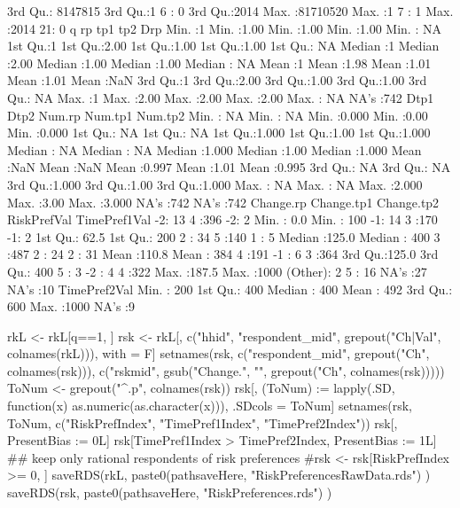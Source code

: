 \begin{Schunk}
\begin{Soutput}
 3rd Qu.: 8147815   3rd Qu.:1   6 :  0                  3rd Qu.:2014  
 Max.   :81710520   Max.   :1   7 :  1                  Max.   :2014  
                                21:  0                                
       q           rp            tp1            tp2            Drp     
 Min.   :1   Min.   :1.00   Min.   :1.00   Min.   :1.00   Min.   : NA  
 1st Qu.:1   1st Qu.:2.00   1st Qu.:1.00   1st Qu.:1.00   1st Qu.: NA  
 Median :1   Median :2.00   Median :1.00   Median :1.00   Median : NA  
 Mean   :1   Mean   :1.98   Mean   :1.01   Mean   :1.01   Mean   :NaN  
 3rd Qu.:1   3rd Qu.:2.00   3rd Qu.:1.00   3rd Qu.:1.00   3rd Qu.: NA  
 Max.   :1   Max.   :2.00   Max.   :2.00   Max.   :2.00   Max.   : NA  
                                                          NA's   :742  
      Dtp1          Dtp2         Num.rp         Num.tp1        Num.tp2     
 Min.   : NA   Min.   : NA   Min.   :0.000   Min.   :0.00   Min.   :0.000  
 1st Qu.: NA   1st Qu.: NA   1st Qu.:1.000   1st Qu.:1.00   1st Qu.:1.000  
 Median : NA   Median : NA   Median :1.000   Median :1.00   Median :1.000  
 Mean   :NaN   Mean   :NaN   Mean   :0.997   Mean   :1.01   Mean   :0.995  
 3rd Qu.: NA   3rd Qu.: NA   3rd Qu.:1.000   3rd Qu.:1.00   3rd Qu.:1.000  
 Max.   : NA   Max.   : NA   Max.   :2.000   Max.   :3.00   Max.   :3.000  
 NA's   :742   NA's   :742                                                 
 Change.rp   Change.tp1  Change.tp2  RiskPrefVal     TimePref1Val 
 -2: 13    4      :396   -2:  2     Min.   :  0.0   Min.   : 100  
 -1: 14    3      :170   -1:  2     1st Qu.: 62.5   1st Qu.: 200  
 2 : 34    5      :140   1 :  5     Median :125.0   Median : 400  
 3 :487    2      : 24   2 : 31     Mean   :110.8   Mean   : 384  
 4 :191    -1     :  6   3 :364     3rd Qu.:125.0   3rd Qu.: 400  
 5 :  3    -2     :  4   4 :322     Max.   :187.5   Max.   :1000  
           (Other):  2   5 : 16     NA's   :27      NA's   :10    
  TimePref2Val 
 Min.   : 200  
 1st Qu.: 400  
 Median : 400  
 Mean   : 492  
 3rd Qu.: 600  
 Max.   :1000  
 NA's   :9     
\end{Soutput}
\begin{Sinput}
rkL <- rkL[q==1, ]
rsk <- rkL[, c("hhid", "respondent_mid", grepout("Ch|Val", colnames(rkL))), with = F]
setnames(rsk, c("respondent_mid", grepout("Ch", colnames(rsk))), 
  c("rskmid", gsub("Change.", "", grepout("Ch", colnames(rsk)))))
ToNum <- grepout("^.p", colnames(rsk))
rsk[, (ToNum) := lapply(.SD, function(x) as.numeric(as.character(x))), .SDcols = ToNum]
setnames(rsk, ToNum, c("RiskPrefIndex", "TimePref1Index", "TimePref2Index"))
rsk[, PresentBias := 0L]
rsk[TimePref1Index > TimePref2Index, PresentBias := 1L]
## keep only rational respondents of risk preferences
#rsk <- rsk[RiskPrefIndex >= 0, ]
saveRDS(rkL, 
  paste0(pathsaveHere, "RiskPreferencesRawData.rds")
)
saveRDS(rsk, 
  paste0(pathsaveHere, "RiskPreferences.rds")
)
\end{Sinput}
\end{Schunk}
